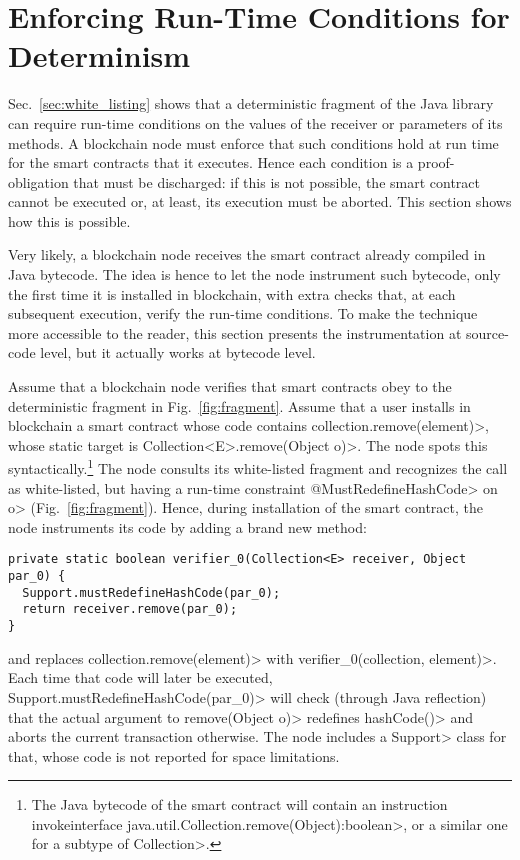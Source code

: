 \section{Enforcing Run-Time Conditions for Determinism}\label{sec:enforcing}

Sec.~\ref{sec:white_listing} shows that a deterministic fragment of the Java library
can require run-time conditions on the values of the receiver or
parameters of its methods. A blockchain node must enforce that such conditions hold
at run time for the smart contracts that it executes. Hence each condition
is a proof-obligation that must be discharged: if this is not possible, the smart contract
cannot be executed or, at least, its execution must be aborted. This section shows how
this is possible.

Very likely, a blockchain node receives the smart contract already compiled in Java bytecode.
The idea is hence to let the node instrument such bytecode, only the first time it is installed in blockchain,
with extra checks that, at each subsequent execution, verify the run-time conditions.
To make the technique more accessible to the reader, this section presents
the instrumentation at source-code level, but it actually works at bytecode level.

Assume that a blockchain node verifies that smart contracts obey to the deterministic
fragment in Fig.~\ref{fig:fragment}.
Assume that a user installs in blockchain a smart contract whose
code contains \<collection.remove(element)>, whose static target is
\<Collection$\text{<}$E$\text{>}$.remove(Object o)>.
The node spots this syntactically.\footnote{The Java bytecode of the
  smart contract will
  contain an instruction \<invokeinterface java.util.Collection.remove(Object):boolean>,
  or a similar one for a subtype of \<Collection>.}
The node consults its white-listed fragment and recognizes the call as
white-listed, but having a run-time constraint \<@MustRedefineHashCode> on \<o>
(Fig.~\ref{fig:fragment}). Hence, during installation of the
smart contract, the node instruments its code by adding a brand new method:

{\small\begin{verbatim}
private static boolean verifier_0(Collection<E> receiver, Object par_0) {
  Support.mustRedefineHashCode(par_0);
  return receiver.remove(par_0);
}
\end{verbatim}}

\noindent
and replaces \<collection.remove(element)> with \<verifier\_0(collection, element)>.
Each time that code will later be executed,
\<Support.mustRedefineHashCode(par\_0)> will check (through Java reflection)
that the actual argument
to \<remove(Object o)> redefines \<hashCode()> and aborts
the current transaction otherwise. The node includes a
\<Support> class for that, whose
code is not reported for space limitations.

